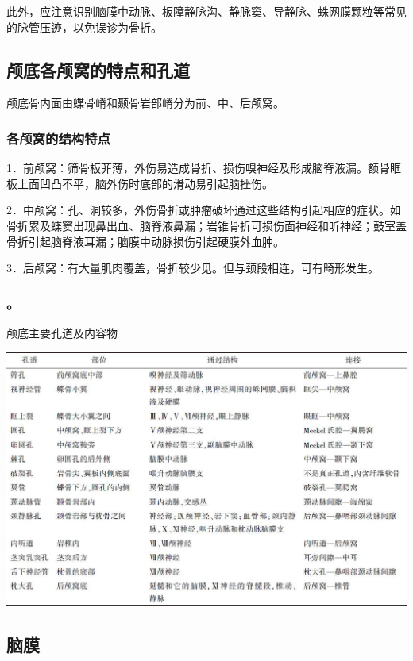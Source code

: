 此外，应注意识别脑膜中动脉、板障静脉沟、静脉窦、导静脉、蛛网膜颗粒等常见的脉管压迹，以免误诊为骨折。

\subsection{颅底各颅窝的特点和孔道}

颅底骨内面由蝶骨嵴和颞骨岩部嵴分为前、中、后颅窝。

\subsubsection{各颅窝的结构特点}

1．前颅窝：筛骨板菲薄，外伤易造成骨折、损伤嗅神经及形成脑脊液漏。额骨眶板上面凹凸不平，脑外伤时底部的滑动易引起脑挫伤。

2．中颅窝：孔、洞较多，外伤骨折或肿瘤破坏通过这些结构引起相应的症状。如骨折累及蝶窦出现鼻出血、脑脊液鼻漏；岩锥骨折可损伤面神经和听神经；鼓室盖骨折引起脑脊液耳漏；脑膜中动脉损伤引起硬膜外血肿。

3．后颅窝：有大量肌肉覆盖，骨折较少见。但与颈段相连，可有畸形发生。

\subsubsection{。}

\begin{table}[htbp]
\centering
\caption{颅底主要孔道及内容物}
\label{tab2-1}
\includegraphics[width=\textwidth,height=\textheight,keepaspectratio]{./images/Image00004.jpg}
\end{table}

\subsection{脑膜}

